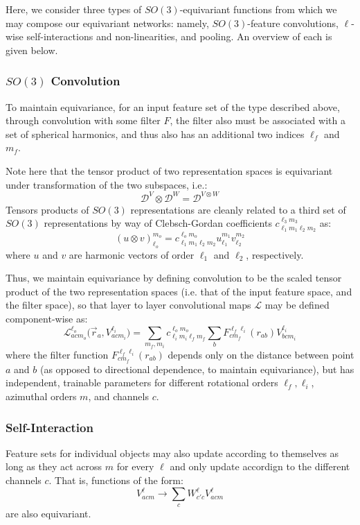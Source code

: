 \documentclass[10pt,a4paper]{article}
\begin{document}
Here, we consider three types of $SO(3)$-equivariant functions from which we may compose our equivariant networks: namely, $SO(3)$-feature convolutions, $\ell$-wise self-interactions and non-linearities, and pooling. An overview of each is given below.

\subsubsection{$SO(3)$ Convolution}
To maintain equivariance, for an input feature set of the type described above,  through convolution with some filter $F$,  the filter also must be associated with a set of spherical harmonics, and thus also has an additional two indices $\ell_f$ and $m_f$. 

Note here that the tensor product of two representation spaces is equivariant under transformation of the two subspaces, i.e.:
$$
\mathcal{D}^V\otimes \mathcal{D}^W=\mathcal{D}^{V\otimes W}
$$
Tensors products of $SO(3)$ representations are cleanly related to a third set of $SO(3)$ representations by way of Clebsch-Gordan coefficients $c^{\ell_3m_3}_{\ell_1m_1\ell_2m_2}$ as:
$$
(u\otimes v)_{\ell_o}^{m_o} = c_{\ell_1m_1\ell_2m_2}^{\ell_om_o}u_{\ell_1}^{m_1}v_{\ell_2}^{m_2}
$$
where $u$ and $v$ are harmonic vectors of order $\ell_1$ and $\ell_2$, respectively.

Thus, we maintain equivariance by defining convolution to be the scaled tensor product of the two representation spaces (i.e. that of the input feature space, and the filter space), so that layer to layer convolutional maps $\mathcal{L}$ may be defined component-wise as:
$$
\mathcal{L}^{\ell_o}_{acm_o}\big(\vec{r}_a,V_{acm_i}^{\ell_i}\big) = \sum_{m_f,m_i}c_{\ell_im_i\ell_fm_f}^{\ell_o m_o}\sum_{b}F^{\ell_f\ell_i}_{cm_f}(r_{ab})V_{bcm_i}^{\ell_i}
$$
where the filter function $F^{\ell_f\ell_i}_{cm_f}(r_{ab})$ depends only on the distance between point $a$ and $b$ (as opposed to directional dependence, to maintain equivariance), but has independent, trainable parameters for different rotational orders $\ell_f, \ell_i$, azimuthal orders $m$, and channels $c$.

\subsubsection{Self-Interaction}
Feature sets for individual objects may also update according to themselves as long as they act across $m$ for every $\ell$ and only update accordign to the different channels $c$. That is, functions of the form:
$$
V_{acm}^{\ell} \rightarrow  \sum _{c}W^{\ell}_{c'c}V_{acm}^{\ell}
$$
are also equivariant. 
\end{document}
